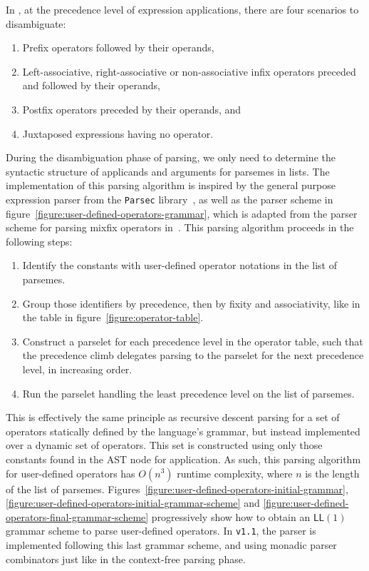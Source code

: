 In \Beluga, at the precedence level of expression applications, there are four scenarios to disambiguate:
\begin{enumerate}
\item Prefix operators followed by their operands,
\item Left-associative, right-associative or non-associative infix operators preceded and followed by their operands,
\item Postfix operators preceded by their operands, and
\item Juxtaposed expressions having no operator.
\end{enumerate}

During the disambiguation phase of parsing, we only need to determine the syntactic structure of applicands and arguments for parsemes in lists.
The implementation of this parsing algorithm is inspired by the general purpose expression parser from the \texttt{Parsec} library~\cite{leijen2001parsec}, as well as the parser scheme in figure~\ref{figure:user-defined-operators-grammar}, which is adapted from the parser scheme for parsing mixfix operators in~\cite{danielsson2008parsing}.
This parsing algorithm proceeds in the following steps:
\begin{enumerate}
\item Identify the constants with user-defined operator notations in the list of parsemes.
\item Group those identifiers by precedence, then by fixity and associativity, like in the table in figure~\ref{figure:operator-table}.
\item Construct a parselet for each precedence level in the operator table, such that the precedence climb delegates parsing to the parselet for the next precedence level, in increasing order.
\item Run the parselet handling the least precedence level on the list of parsemes.
\end{enumerate}
This is effectively the same principle as recursive descent parsing for a set of operators statically defined by the language's grammar, but instead implemented over a dynamic set of operators.
This set is constructed using only those constants found in the \ac{AST} node for application.
As such, this parsing algorithm for user-defined operators has $ O(n^3) $ runtime complexity, where $ n $ is the length of the list of parsemes.
Figures~\ref{figure:user-defined-operators-initial-grammar}, \ref{figure:user-defined-operators-initial-grammar-scheme} and \ref{figure:user-defined-operators-final-grammar-scheme} progressively show how to obtain an $\mathsf{LL}(1)$ grammar scheme to parse user-defined operators.
In \Beluga \texttt{v1.1}, the parser is implemented following this last grammar scheme, and using monadic parser combinators just like in the context-free parsing phase.

